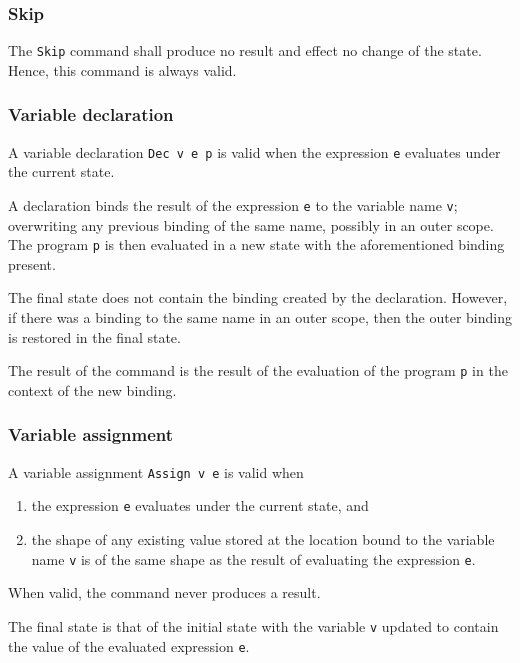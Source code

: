 \documentclass[a4paper]{amsbook}
\begin{document}
\lstset{language=pancakeAbs}

\subsubsection{Skip}
\label{sec:skip}

The \lstinline!Skip! command shall produce no result and effect no change of the state. Hence, this command is always valid.

\subsubsection{Variable declaration}
\label{sec:variable-declaration}

A variable declaration \lstinline!Dec v e p! is valid when the expression \lstinline!e! evaluates under the current state.

A declaration binds the result of the expression \lstinline!e! to the variable name \lstinline!v!; overwriting any previous binding of the same name, possibly in an outer scope. The program \lstinline!p! is then evaluated in a new state with the aforementioned binding present.

The final state does not contain the binding created by the declaration. However, if there was a binding to the same name in an outer scope, then the outer binding is restored in the final state.

The result of the command is the result of the evaluation of the program \lstinline!p! in the context of the new binding.

\subsubsection{Variable assignment}
\label{sec:variable-assign}

A variable assignment \lstinline!Assign v e! is valid when
\begin{enumerate}
  \item the expression \lstinline!e! evaluates under the current state, and
  \item the shape of any existing value stored at the location bound to the variable name \lstinline!v! is of the same shape as the result of evaluating the expression \lstinline!e!.
\end{enumerate}

When valid, the command never produces a result.

The final state is that of the initial state with the variable \lstinline!v! updated to contain the value of the evaluated expression \lstinline!e!.
\end{document}
